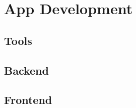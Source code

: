 \chapter{App Development}

\thispagestyle{empty}

\section{Tools}


\section{Backend}


\section{Frontend}